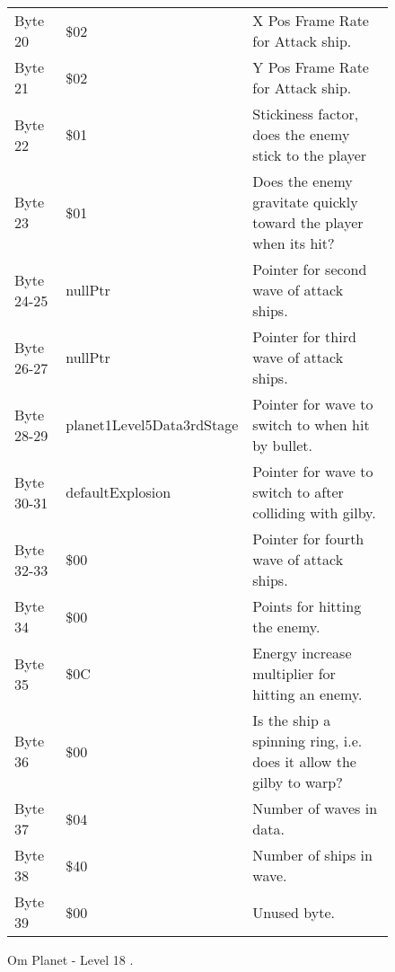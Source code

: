 \begin{figure}[H]
{\begin{adjustbox}{width=12cm}
\begin{tabular}{lll}
 Byte 20    & \$02                       & X Pos Frame Rate for Attack ship.                                   \\
 Byte 21    & \$02                       & Y Pos Frame Rate for Attack ship.                                   \\
 Byte 22    & \$01                       & Stickiness factor, does the enemy stick to the player               \\
 Byte 23    & \$01                       & Does the enemy gravitate quickly toward the player when its hit?    \\
 Byte 24-25 & nullPtr                   & Pointer for second wave of attack ships.                            \\
 Byte 26-27 & nullPtr                   & Pointer for third wave of attack ships.                             \\
 Byte 28-29 & planet1Level5Data3rdStage & Pointer for wave to switch to when hit by bullet.                   \\
 Byte 30-31 & defaultExplosion          & Pointer for  wave to switch to after colliding with gilby.          \\
 Byte 32-33 & \$00                       & Pointer for fourth wave of attack ships.                            \\
 Byte 34    & \$00                       & Points for hitting the enemy.                                       \\
 Byte 35    & \$0C                       & Energy increase multiplier for hitting an enemy.                    \\
 Byte 36    & \$00                       & Is the ship a spinning ring, i.e. does it allow the gilby to warp?  \\
 Byte 37    & \$04                       & Number of waves in data.                                            \\
 Byte 38    & \$40                       & Number of ships in wave.                                            \\
 Byte 39    & \$00                       & Unused byte.                                                        \\
\bottomrule
\end{tabular}

  \end{adjustbox}

  }\caption*{Om Planet - Level 18
.}
\end{figure}

